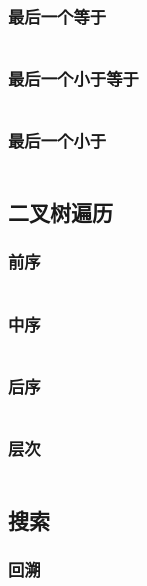 \documentclass[a4paper,11pt]{article}
\begin{document}
\subsubsection{最后一个等于}
\inputminted[linenos,autogobble]{java}{basic/binary-search/last-eq.java}

\subsubsection{最后一个小于等于}
\inputminted[linenos,autogobble]{java}{basic/binary-search/last-leq.java}

\subsubsection{最后一个小于}
\inputminted[linenos,autogobble]{java}{basic/binary-search/last-l.java}

\newpage
\subsection{二叉树遍历}

\subsubsection{前序}
\inputminted[linenos,autogobble]{java}{basic/tree/pre-order.java}

\subsubsection{中序}
\inputminted[linenos,autogobble]{java}{basic/tree/in-order.java}

\subsubsection{后序}
\inputminted[linenos,autogobble]{java}{basic/tree/post-order.java}

\subsubsection{层次}
\inputminted[linenos,autogobble]{java}{basic/tree/level-order.java}

\newpage
\subsection{搜索}

\subsubsection{回溯}
\inputminted[linenos,autogobble]{java}{basic/search/backtracking.java}
\end{document}
